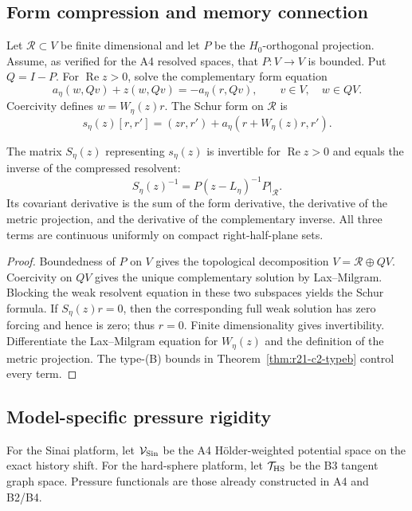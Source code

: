 \subsection{Form compression and memory connection}

Let $\mathcal R\subset V$ be finite dimensional and let $P$ be the
$H_0$-orthogonal projection.  Assume, as verified for the A4 resolved spaces,
that $P:V\to V$ is bounded.  Put $Q=I-P$.  For
$\operatorname{Re}z>0$, solve the complementary form equation
\[
 a_\eta(w,Qv)+z(w,Qv)=-a_\eta(r,Qv),
 \qquad v\in V,\quad w\in QV.
\]
Coercivity defines $w=W_\eta(z)r$.  The Schur form on $\mathcal R$ is
\[
 s_\eta(z)[r,r']=(z r,r')+a_\eta(r+W_\eta(z)r,r').
\]

\begin{theorem}
\label{thm:r21-c2-schur}
The matrix $S_\eta(z)$ representing $s_\eta(z)$ is invertible for
$\operatorname{Re}z>0$ and equals the inverse of the compressed resolvent:
\[
 S_\eta(z)^{-1}=P(z-L_\eta)^{-1}P|_{\mathcal R}.
\]
Its covariant derivative is the sum of the form derivative, the derivative of
the metric projection, and the derivative of the complementary inverse.  All
three terms are continuous uniformly on compact right-half-plane sets.
\end{theorem}

\begin{proof}
Boundedness of $P$ on $V$ gives the topological decomposition
$V=\mathcal R\oplus QV$.  Coercivity on $QV$ gives the unique complementary
solution by Lax--Milgram.  Blocking the weak resolvent equation in these two
subspaces yields the Schur formula.  If $S_\eta(z)r=0$, then the corresponding
full weak solution has zero forcing and hence is zero; thus $r=0$.  Finite
dimensionality gives invertibility.  Differentiate the Lax--Milgram equation
for $W_\eta(z)$ and the definition of the metric projection.  The type-(B)
bounds in Theorem~\ref{thm:r21-c2-typeb} control every term.
\end{proof}

\subsection{Model-specific pressure rigidity}

For the Sinai platform, let $\mathcal V_{\rm Sin}$ be the A4 H\"older-weighted
potential space on the exact history shift.  For the hard-sphere platform, let
$\mathcal T_{\rm HS}$ be the B3 tangent graph space.  Pressure functionals are
those already constructed in A4 and B2/B4.

